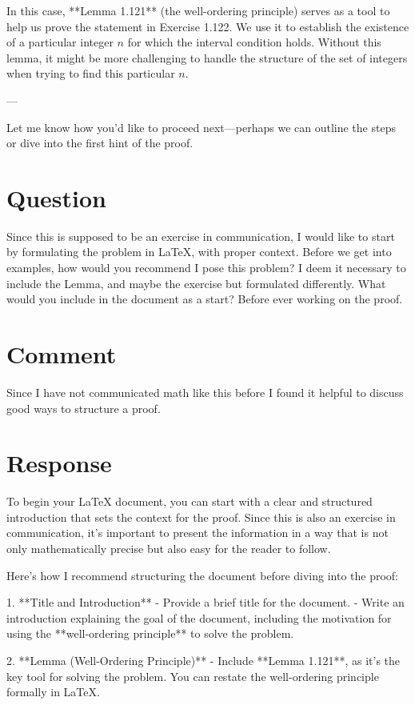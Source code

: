 \documentclass{article}
\begin{document}
In this case, **Lemma 1.121** (the well-ordering principle) serves as a tool to help us prove the statement in Exercise 1.122. We use it to establish the existence of a particular integer \( n \) for which the interval condition holds. Without this lemma, it might be more challenging to handle the structure of the set of integers when trying to find this particular \( n \).

---

Let me know how you'd like to proceed next—perhaps we can outline the steps or dive into the first hint of the proof.

\section*{Question}

Since this is supposed to be an exercise in communication, I would like to start by formulating the problem in LaTeX, with proper context. Before we get into examples, how would you recommend I pose this problem? I deem it necessary to include the Lemma, and maybe the exercise but formulated differently. What would you include in the document as a start? Before ever working on the proof.

\section*{Comment}
Since I have not communicated math like this before I found it helpful to discuss good ways to structure a proof.

\section*{Response}

To begin your LaTeX document, you can start with a clear and structured introduction that sets the context for the proof. Since this is also an exercise in communication, it's important to present the information in a way that is not only mathematically precise but also easy for the reader to follow.

Here's how I recommend structuring the document before diving into the proof:

1. **Title and Introduction**
   - Provide a brief title for the document.
   - Write an introduction explaining the goal of the document, including the motivation for using the **well-ordering principle** to solve the problem.

2. **Lemma (Well-Ordering Principle)**
   - Include **Lemma 1.121**, as it's the key tool for solving the problem. You can restate the well-ordering principle formally in LaTeX.
\end{document}
